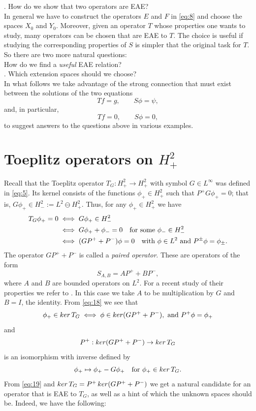 \documentclass[10pt,a4paper]{amsart}
\def\beq{\begin{equation}}
\def\eeq{\end{equation}}
\def\ker{\mathop{\rm ker}\nolimits}
\begin{document}
. How do we show that two operators are EAE?\\

In general we have to construct the operators $E$ and $F$ in \eqref{eq:8} and choose the spaces $X_0$ and $Y_0$. Moreover,
given an operator $T$ whose properties one wants to study, many operators can be chosen that
are EAE to $T$. The choice is useful if studying the corresponding properties
of $S$ is simpler that the original task for $T$. So there are two more natural questions:\\

 How do we find a {\em useful\/} EAE relation?\\

. Which extension spaces should we choose?\\

In what follows we take advantage of the strong connection that must exist between the solutions of the two equations
\[
Tf=g, \qquad S\phi=\psi,
\]
and, in particular,
\[
Tf=0, \qquad S\phi=0,
\]
to suggest answers to the questions above in various examples.

\section{Toeplitz operators on $H^2_+$}

Recall that the Toeplitz operator $T_G: H^2_+ \to H^2_+$ with symbol $G \in L^\infty$
was defined  in \eqref{eq:5}.
Its kernel consists of the functions $\phi_+ \in H^2_+$ such that 
$P^+ G \phi_+=0$; that is, $G\phi_+ \in H^2_-:= L^2 \ominus H^2_+$. Thus,
for any $\phi_+ \in H^2_+$ we have
\begin{align}\label{eq:18}
T_G \phi_+ = 0 & \iff G\phi_+\in H^2_-\nonumber
\\
& \iff G\phi_+ + \phi_- = 0 \quad \hbox{for some } \phi_- \in H^2_- \nonumber \\
& \iff (GP^+ + P^-)\phi=0 \quad \hbox{with } \phi \in L^2 \hbox{ and } P^\pm\phi=\phi_\pm.
\end{align}
The operator $GP^+ + P^-$ is called a {\em paired operator}. These are operators
of the form 
\[
S_{A,B} = AP^+ + B P^-,
\]
where $A$ and $B$ are bounded operators on $L^2$. 
For a recent study of their properties we refer to \cite{CGP24,CP24}.
In this case
we take $A$ to be multiplication by $G$ and $B=I$, the identity. From
\eqref{eq:18} we see that
\beq\label{eq:19}
\phi_+ \in \ker T_G \iff \phi \in \ker (GP^++P^-), \hbox{ and } P^+\phi=\phi_+ 
\eeq
and
\[
P^+: \ker (GP^++P^-) \to \ker T_G
\]
is an isomorphism with inverse defined by
\[
\phi_+ \mapsto \phi_+ - G \phi_+ \quad \hbox{for } \phi_+ \in \ker T_G.
\]
From \eqref{eq:19} and $\ker T_G=P^+ \ker (GP^++P^-)$ we get a natural candidate for
an operator that is EAE to $T_G$, as well as a 
hint of which the unknown spaces should be. Indeed, we have the following:
\end{document}
